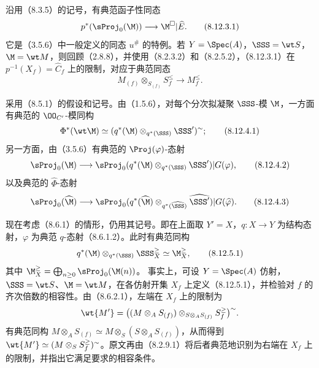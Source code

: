  沿用（8.3.5）的记号，有典范函子性同态
\begin{equation}p^*(\sProj_0(\M))\longrightarrow\M^\square|\widehat E.\tag{8.12.3.1}\end{equation}
它是（3.5.6）中一般定义的同态 $u^\#$ 的特例。若 $Y=\Spec(A)$，$\SSS=\wt S$，$\M=\wt M$，则回顾（2.8.8），并使用（8.2.3.2）和（8.2.5.2），（8.12.3.1）在 $p^{-1}(X_f)=\widehat C_f$ 上的限制，对应于典范同态
\begin{equation}M_{(f)}\otimes_{S_{(f)}}S_f^{\leq}\longrightarrow M_f^{\leq}.\tag{8.12.3.2}\end{equation}

 采用（8.5.1）的假设和记号。由（1.5.6），对每个分次拟凝聚 $\SSS$-模 $\M$，一方面有典范的 $\OO_{C'}$-模同构
\begin{equation}\Phi^*(\wt\M)\simeq(q^*(\M)\otimes_{q^*(\SSS)}\SSS')^{\sim};\tag{8.12.4.1}\end{equation}
另一方面，由（3.5.6）有典范的 $\Proj(\varphi)$-态射
\begin{equation}\sProj_0(\M)\longrightarrow
\sProj_0(q^*(\M)\otimes_{q^*(\SSS)}\SSS')|G(\varphi),\tag{8.12.4.2}\end{equation}
以及典范的 $\widehat\Phi$-态射
\begin{equation}\sProj_0(\widehat\M)\longrightarrow
\sProj_0(q^*(\widehat\M)\otimes_{q^*(\widehat\SSS)}\widehat{\SSS'})|G(\widehat\varphi).\tag{8.12.4.3}\end{equation}

 现在考虑（8.6.1）的情形，仍用其记号。即在上面取 $Y'=X$，$q:X\to Y$ 为结构态射，$\varphi$ 为典范 $q$-态射（8.6.1.2）。此时有典范同构
\begin{equation}q^*(\M)\otimes_{q^*(\SSS)}\SSS_X^{\geq}\simeq\M_X^{\geq},\tag{8.12.5.1}\end{equation}
其中 $\M_X^{\geq}=\bigoplus_{n\geq0}\sProj_0(\M(n))$。
事实上，可设 $Y=\Spec(A)$ 仿射，$\SSS=\wt S$、$\M=\wt M$，在各仿射开集 $X_f$ 上定义（8.12.5.1），并检验对 $f$ 的齐次倍数的相容性。由（8.6.2.1），左端在 $X_f$ 上的限制为
\[\wt{M'}=\bigl((M\otimes_A S_{(f)})\otimes_{S\otimes_A S_{(f)}}S_f^{\geq}\bigr)^{\sim}.\]
有典范同构 $M\otimes_A S_{(f)}\simeq M\otimes_S(S\otimes_A S_{(f)})$，从而得到 $\wt{M'}\simeq(M\otimes_S S_f^{\geq})^{\sim}$。原文再由（8.2.9.1）将后者典范地识别为右端在 $X_f$ 上的限制，并指出它满足要求的相容条件。


